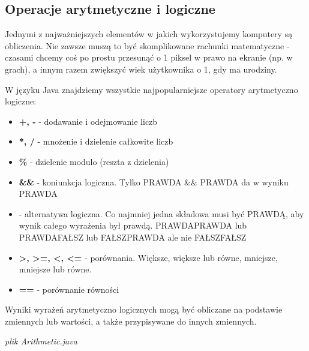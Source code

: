 \documentclass[letterpaper,10pt,english]{sphinxmanual}
\begin{document}
\subsection{Operacje arytmetyczne i logiczne}
\label{wprowadzenie:operacje-arytmetyczne-i-logiczne}
Jednymi z najważniejszych elementów w jakich wykorzystujemy komputery są obliczenia. Nie zawsze muszą to być skomplikowane rachunki matematyczne - czasami chcemy coś po prostu przesunąć o 1 piksel w prawo na ekranie (np. w grach), a innym razem zwiększyć wiek użytkownika o 1, gdy ma urodziny.

W języku Java znajdziemy wszystkie najpopularniejsze operatory arytmetyczno logiczne:
\begin{itemize}
\item {} 
\textbf{+, -} - dodawanie i odejmowanie liczb

\item {} 
\textbf{*, /} - mnożenie i dzielenie całkowite liczb

\item {} 
\textbf{\%} - dzielenie modulo (reszta z dzielenia)

\item {} 
\textbf{\&\&} - koniunkcja logiczna. Tylko PRAWDA \&\& PRAWDA da w wyniku PRAWDA

\item {} 
\textbf{\textbar{}\textbar{}} - alternatywa logiczna. Co najmniej jedna składowa musi być PRAWDĄ, aby wynik całego wyrażenia był prawdą. PRAWDA\textbar{}\textbar{}PRAWDA lub PRAWDA\textbar{}\textbar{}FAŁSZ lub FAŁSZ\textbar{}\textbar{}PRAWDA ale nie FAŁSZ\textbar{}\textbar{}FAŁSZ

\item {} 
\textbf{\textgreater{}, \textgreater{}=, \textless{}, \textless{}=} - porównania. Większe, większe lub równe, mniejsze, mniejsze lub równe.

\item {} 
\textbf{==} - porównanie równości

\end{itemize}

Wyniki wyrażeń arytmetyczno logicznych mogą być obliczane na podstawie zmiennych lub wartości, a także przypisywane do innych zmiennych.

\emph{plik Arithmetic.java}
\end{document}
